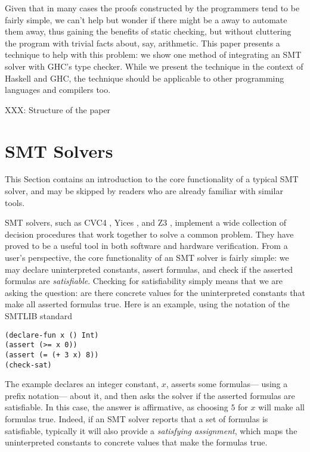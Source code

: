 \documentclass{sigplanconf}
\begin{document}
Given that in many cases the proofs constructed by the programmers
tend to be fairly simple, we can't help but wonder if there might
be a away to automate them away, thus gaining the benefits of
static checking, but without cluttering the program with trivial
facts about, say, arithmetic.  This paper presents a technique
to help with this problem: we show one method of integrating
an SMT solver with GHC's type checker.  While we present
the technique in the context of Haskell and GHC, the technique
should be applicable to other programming languages and compilers too.

XXX: Structure of the paper


\section {SMT Solvers}

This Section contains an introduction to the core functionality
of a typical SMT solver, and may be skipped by readers who are already
familiar with similar tools.

SMT solvers, such as CVC4 \cite{cvc4}, Yices \cite{yices}, and Z3
\cite{z3}, implement a wide collection of decision procedures that
work together to solve a common problem.  They have proved to be a useful
tool in both software and hardware verification.
From a user's perspective, the core functionality of an SMT solver is fairly
simple: we may declare uninterpreted constants, assert formulas,
and check if the asserted formulas are {\em satisfiable}.  Checking
for satisfiability simply means that we are asking the
question: are there concrete values for the uninterpreted constants
that make all asserted formulas true.  Here is an example, using
the notation of the SMTLIB standard \cite{smtlib2}

\begin{Verbatim}
(declare-fun x () Int)
(assert (>= x 0))
(assert (= (+ 3 x) 8))
(check-sat)
\end{Verbatim}

The example declares an integer constant, $x$, asserts some formulas---%
using a prefix notation---%
about it, and then asks the solver if the asserted formulas are
satisfiable.  In this case, the answer is affirmative, as choosing
$5$ for $x$ will make all formulas true.  Indeed, if an
SMT solver reports that a set of formulas is satisfiable, typically
it will also provide a {\em satisfying assignment}, which maps
the uninterpreted constants to concrete values that make the
formulas true.
\end{document}
